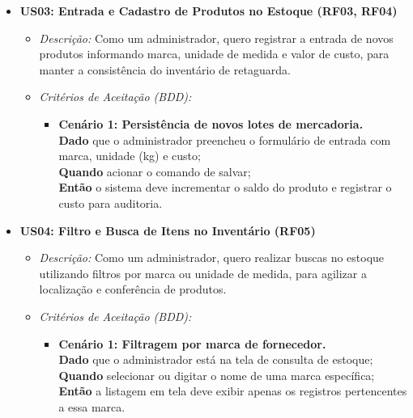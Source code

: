 \documentclass[
	12pt,				%
	openany,			%
	oneside,			%
	a4paper,			%
	english,			%
	french,				%
	spanish,			%
	brazil				%
	]{abntex2}
\begin{document}
\begin{itemize}
    \item \textbf{US03: Entrada e Cadastro de Produtos no Estoque (RF03, RF04)}
    \begin{itemize}
        \item \textit{Descrição:} Como um administrador, quero registrar a entrada de novos produtos informando marca, unidade de medida e valor de custo, para manter a consistência do inventário de retaguarda.
        \item \textit{Critérios de Aceitação (BDD):}
        \begin{itemize}
            \item \textbf{Cenário 1: Persistência de novos lotes de mercadoria.} \\
            \textbf{Dado} que o administrador preencheu o formulário de entrada com marca, unidade (kg) e custo; \\
            \textbf{Quando} acionar o comando de salvar; \\
            \textbf{Então} o sistema deve incrementar o saldo do produto e registrar o custo para auditoria.
        \end{itemize}
    \end{itemize}

    \item \textbf{US04: Filtro e Busca de Itens no Inventário (RF05)}
    \begin{itemize}
        \item \textit{Descrição:} Como um administrador, quero realizar buscas no estoque utilizando filtros por marca ou unidade de medida, para agilizar a localização e conferência de produtos.
        \item \textit{Critérios de Aceitação (BDD):}
        \begin{itemize}
            \item \textbf{Cenário 1: Filtragem por marca de fornecedor.} \\
            \textbf{Dado} que o administrador está na tela de consulta de estoque; \\
            \textbf{Quando} selecionar ou digitar o nome de uma marca específica; \\
            \textbf{Então} a listagem em tela deve exibir apenas os registros pertencentes a essa marca.
        \end{itemize}
    \end{itemize}


\end{itemize}
\end{document}
